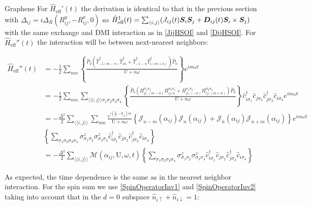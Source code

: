 \begin{section}{Graphene}
For $\hat{H}_{\text{eff}}'(t)$ the derivation is identical to that in the previous section with $\Delta_{ij} = i\Delta_R (R_{ij}^y, - R_{ij}^x, 0)$ so $\hat{H}_{\text{eff}}^1(t) = \sum_{\langle i,j \rangle} (J_{ij}(t) \boldsymbol{S}_i\boldsymbol{S}_j + \boldsymbol{D}_{ij}(t)\boldsymbol{S}_i \times \boldsymbol{S}_j)$ with the same exchange and DMI interaction as in \ref{JijHSOI} and \ref{DijHSOI}. For $\hat{H}_{\text{eff}}''(t)$ the interaction will be between next-nearest neighbors:

\begin{align*}
\hat{H}_{\text{eff}}''(t) &= -\frac{1}{2}\sum_{mn} \left\{ \frac{\hat{P}_0  (\hat{T}_{-1(m-n)}^2\hat{T}_{1n}^2 + \hat{T}_{-1-n}^2\hat{T}_{1(m+n)}^2)\hat{P}_0}{U+n\omega} \right\} e^{im\omega t} \\
&= -\frac{1}{2}\sum_{mn} \sum_{\langle \langle i,j \rangle \rangle \sigma_1 \sigma_2 \sigma_3 \sigma_4} \left\{ \frac{\hat{P}_0 (\Pi_{ji,(m-n)}^{\sigma_1\sigma_2}\Pi_{ij,n}^{\sigma_3\sigma_4} + \Pi_{ji,(-n)}^{\sigma_1\sigma_2}\Pi_{ij,(m+n)}^{\sigma_3\sigma_4}) \hat{P}_0}{U+n\omega} \right\}\hat{c}_{i\sigma_1}^\dagger\hat{c}_{j\sigma_2}\hat{c}_{j\sigma_3}^\dagger\hat{c}_{i\sigma_4} e^{im\omega t} \\
&= -\frac{\Delta^2}{2} \sum_{\langle \langle i,j \rangle \rangle} \sum_{mn} \frac{e^{i(\frac{\pi}{2}-\theta_{ij})m}}{\text{U}+n\omega} \left\{ \mathcal{J}_{n-m}(\alpha_{ij})\mathcal{J}_{n}(\alpha_{ij})+\mathcal{J}_{n}(\alpha_{ij})\mathcal{J}_{n+m}(\alpha_{ij}) \right\} e^{im \omega t} \\
& \left\{ \sum_{\sigma_1 \sigma_2 \sigma_3 \sigma_4} \sigma_{\sigma_1 \sigma_2}^z\sigma_{\sigma_3 \sigma_4}^z \hat{c}_{i\sigma_1}^\dagger\hat{c}_{j\sigma_2}\hat{c}_{j\sigma_3}^\dagger\hat{c}_{i\sigma_4} \right\} \\
&= -\frac{\Delta^2}{2} \sum_{\langle \langle i,j \rangle \rangle} \mathcal{M}(\alpha_{ij}, \text{U}, \omega, t) \left\{ \sum_{\sigma_1 \sigma_2 \sigma_3 \sigma_4} \sigma_{\sigma_1 \sigma_2}^z\sigma_{\sigma_3 \sigma_4}^z \hat{c}_{i\sigma_1}^\dagger\hat{c}_{j\sigma_2}\hat{c}_{j\sigma_3}^\dagger\hat{c}_{i\sigma_4} \right\}
\end{align*}

As expected, the time dependence is the same as in the nearest neighbor interaction. For the spin sum we use \ref{SpinOperatorInv1} and \ref{SpinOperatorInv2} taking into account that in the $d=0$ subspace $\hat{n}_{i\uparrow}+\hat{n}_{i\downarrow} = 1$:


\end{section}
